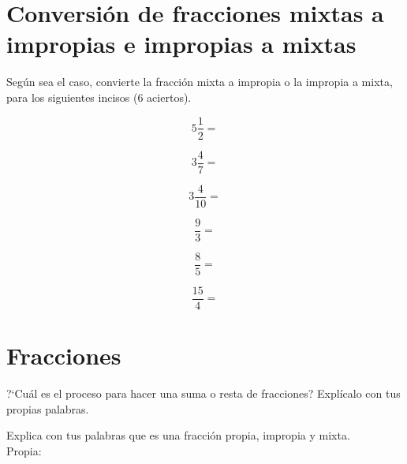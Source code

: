 \documentclass[11pt]{article}
\begin{document}
\vspace{3cm}

\section{Conversi\'on de fracciones mixtas a impropias e impropias a mixtas}
Seg\'un sea el caso, convierte la fracci\'on mixta a impropia o la impropia a
mixta, para los siguientes incisos (6 aciertos).

\begin{multicols}{3}
    \begin{equation} 5\frac{1}{2}=  \nonumber \end{equation}

    \begin{equation} 3\frac{4}{7}=  \nonumber \end{equation}

    \begin{equation} 3\frac{4}{10}= \nonumber \end{equation}

    \begin{equation} \frac{9}{3}=   \nonumber \end{equation}

    \begin{equation} \frac{8}{5}=   \nonumber \end{equation}

    \begin{equation} \frac{15}{4}=  \nonumber \end{equation}
\end{multicols}

\vspace{1cm}



\section{Fracciones}

?`Cu\'al es el proceso para hacer una suma o resta de fracciones? Expl\'icalo
con tus propias palabras.

\vspace{4cm}

Explica con tus palabras que es una fracci\'on propia, impropia y mixta.\\

Propia:

\vspace{1.5cm}
\end{document}

